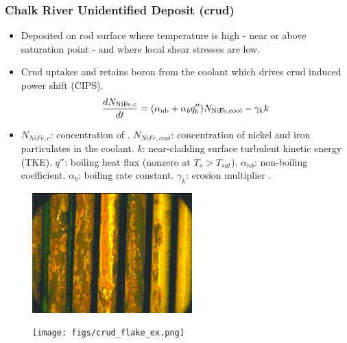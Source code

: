 \documentclass[t, pdftex]{beamer}
\begin{document}
\begin{frame}
\frametitle{Chalk River Unidentified Deposit (crud)}
\vspace{-12pt}
\begin{scriptsize}
    \begin{itemize}
        \item Deposited on rod surface where temperature is high - near or above saturation point - and where local shear stresses are low.
        \item Crud uptakes and retains boron from the coolant which drives
        crud induced power shift (CIPS).       
        \[
        \frac{d N_{\mathrm{\ce{NiFe}},c}}{dt} = (\alpha_{\mathrm{nb}} + \alpha_{b}q''_{b} )N_{\mathrm{\ce{NiFe}}, \mathrm{cool}} - \gamma_k k
        \]
        \item $N_{NiFe,c}$: concentration of . $N_{NiFe,cool}$: concentration of nickel and iron particulates in the coolant.  $k$: near-cladding surface turbulent kinetic energy (TKE).  $q''$: boiling heat flux (nonzero at $T_s>T_{sat}$).  $\alpha_{nb}$: non-boiling coefficient. $\alpha_b$: boiling rate constant.  $\gamma_k$: erosion multiplier \cite{mongoose17}.
        
    \end{itemize}
\end{scriptsize}

\vspace{-12pt}
\begin{figure}
    \centering
    \begin{minipage}{.5\textwidth}
        \centering
        \includegraphics[width=0.55\textwidth]{figs/crud-crud.jpg}
    \end{minipage}%
    \begin{minipage}{.5\textwidth}
        \centering
        \texttt{[image: figs/crud\_flake\_ex.png]}
    \end{minipage}
\end{figure}
\end{frame}
\end{document}
